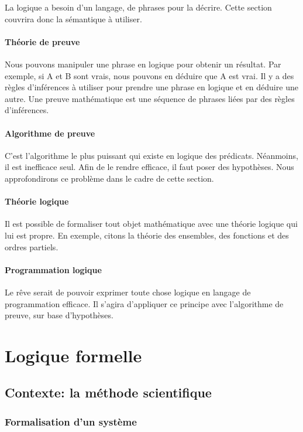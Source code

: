 La logique a besoin d'un langage, de phrases pour la décrire. Cette section couvrira donc la sémantique à utiliser.

\subsection*{Théorie de preuve}

Nous pouvons manipuler une phrase en logique pour obtenir un résultat. Par exemple, si A et B sont vrais, nous pouvons en déduire que A est vrai. Il y a des règles d'inférences à utiliser pour prendre une phrase en logique et en déduire une autre.
Une preuve mathématique est une séquence de phrases liées par des règles d'inférences.

\subsection*{Algorithme de preuve}
C'est l'algorithme le plus puissant qui existe en logique des prédicats. Néanmoins, il est inefficace seul. Afin de le rendre efficace, il faut poser des hypothèses. Nous approfondirons ce problème dans le cadre de cette section. 

\subsection*{Théorie logique}

Il est possible de formaliser tout objet mathématique avec une théorie logique qui lui est propre.  En exemple, citons la théorie des ensembles, des fonctions et des ordres partiels.

\subsection*{Programmation logique}

Le rêve serait de pouvoir exprimer toute chose logique en langage de programmation efficace. Il s'agira d'appliquer ce principe avec l'algorithme de preuve, sur base d'hypothèses.

\part{Logique formelle}
\chapter{Contexte: la méthode scientifique}

\section{Formalisation d'un système}

